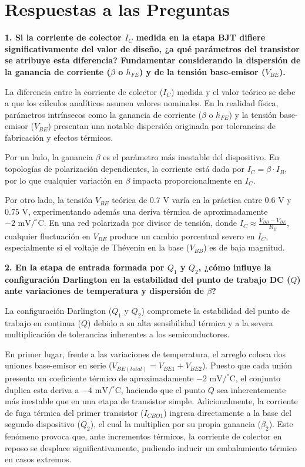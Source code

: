 \section{Respuestas a las Preguntas}

\textbf{1. Si la corriente de colector $I_C$ medida en la etapa BJT difiere significativamente del valor de diseño, ¿a qué parámetros del transistor se atribuye esta diferencia? Fundamentar considerando la dispersión de la ganancia de corriente ($\beta$ o $h_{FE}$) y de la tensión base-emisor ($V_{BE}$).}

La diferencia entre la corriente de colector ($I_C$) medida y el valor teórico se debe a que los cálculos analíticos asumen valores nominales. En la realidad física, parámetros intrínsecos como la ganancia de corriente ($\beta$ o $h_{FE}$) y la tensión base-emisor ($V_{BE}$) presentan una notable dispersión originada por tolerancias de fabricación y efectos térmicos.

Por un lado, la ganancia $\beta$ es el parámetro más inestable del dispositivo. En topologías de polarización dependientes, la corriente está dada por $I_C = \beta \cdot I_B$, por lo que cualquier variación en $\beta$ impacta proporcionalmente en $I_C$. 

Por otro lado, la tensión $V_{BE}$ teórica de $0.7\text{ V}$ varía en la práctica entre $0.6\text{ V}$ y $0.75\text{ V}$, experimentando además una deriva térmica de aproximadamente $-2\text{ mV/}^{\circ}\text{C}$. En una red polarizada por divisor de tensión, donde $I_C \approx \frac{V_{BB} - V_{BE}}{R_E}$, cualquier fluctuación en $V_{BE}$ produce un cambio porcentual severo en $I_C$, especialmente si el voltaje de Thévenin en la base ($V_{BB}$) es de baja magnitud.


\textbf{2. En la etapa de entrada formada por $Q_1$ y $Q_2$, ¿cómo influye la configuración Darlington en la estabilidad del punto de trabajo DC ($Q$) ante variaciones de temperatura y dispersión de $\beta$?}

La configuración Darlington ($Q_1$ y $Q_2$) compromete la estabilidad del punto de trabajo en continua ($Q$) debido a su alta sensibilidad térmica y a la severa multiplicación de tolerancias inherentes a los semiconductores.

En primer lugar, frente a las variaciones de temperatura, el arreglo coloca dos uniones base-emisor en serie ($V_{BE(total)} = V_{BE1} + V_{BE2}$). Puesto que cada unión presenta un coeficiente térmico de aproximadamente $-2\text{ mV/}^{\circ}\text{C}$, el conjunto duplica esta deriva a $-4\text{ mV/}^{\circ}\text{C}$, haciendo que el punto $Q$ sea inherentemente más inestable que en una etapa de transistor simple. Adicionalmente, la corriente de fuga térmica del primer transistor ($I_{CBO1}$) ingresa directamente a la base del segundo dispositivo ($Q_2$), el cual la multiplica por su propia ganancia ($\beta_2$). Este fenómeno provoca que, ante incrementos térmicos, la corriente de colector en reposo se desplace significativamente, pudiendo inducir un embalamiento térmico en casos extremos.

